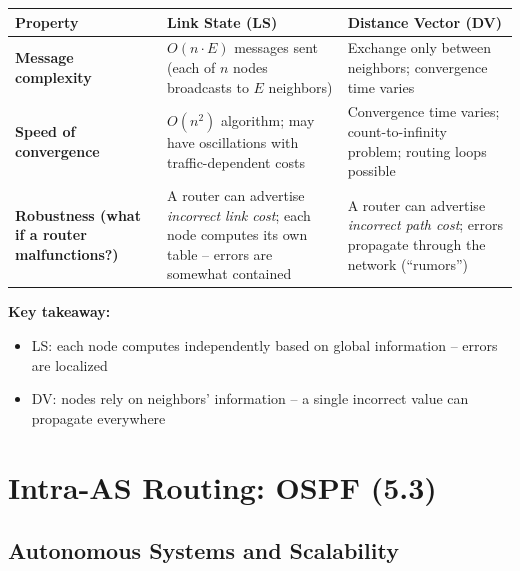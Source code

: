 \begin{exambox}
\begin{center}
\begin{tabular}{p{3.5cm}p{5.5cm}p{5.5cm}}
\toprule
\textbf{Property} & \textbf{Link State (LS)} & \textbf{Distance Vector (DV)} \\
\midrule
\textbf{Message complexity} & $O(n \cdot E)$ messages sent (each of $n$ nodes broadcasts to $E$ neighbors) & Exchange only between neighbors; convergence time varies \\
\midrule
\textbf{Speed of convergence} & $O(n^2)$ algorithm; may have oscillations with traffic-dependent costs & Convergence time varies; count-to-infinity problem; routing loops possible \\
\midrule
\textbf{Robustness (what if a router malfunctions?)} & A router can advertise \emph{incorrect link cost}; each node computes its own table -- errors are somewhat contained & A router can advertise \emph{incorrect path cost}; errors propagate through the network (``rumors'') \\
\bottomrule
\end{tabular}
\end{center}

\medskip
\textbf{Key takeaway:}
\begin{itemize}[noitemsep]
    \item LS: each node computes independently based on global information -- errors are localized
    \item DV: nodes rely on neighbors' information -- a single incorrect value can propagate everywhere
\end{itemize}
\end{exambox}

\section{Intra-AS Routing: OSPF (5.3)}

\subsection{Autonomous Systems and Scalability}

